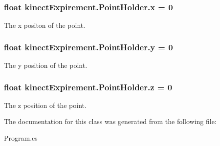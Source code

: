 \subsubsection[{\texorpdfstring{x}{x}}]{\setlength{\rightskip}{0pt plus 5cm}float kinect\+Expirement.\+Point\+Holder.\+x = 0}\hypertarget{classkinect_expirement_1_1_point_holder_a170e58cf7ad5a21dd5c7a50eafbfb0e8}{}\label{classkinect_expirement_1_1_point_holder_a170e58cf7ad5a21dd5c7a50eafbfb0e8}


The x positon of the point. 

\subsubsection[{\texorpdfstring{y}{y}}]{\setlength{\rightskip}{0pt plus 5cm}float kinect\+Expirement.\+Point\+Holder.\+y = 0}\hypertarget{classkinect_expirement_1_1_point_holder_a8e1920f1bd56b015aeae9f19a6f0c5e6}{}\label{classkinect_expirement_1_1_point_holder_a8e1920f1bd56b015aeae9f19a6f0c5e6}


The y position of the point. 

\subsubsection[{\texorpdfstring{z}{z}}]{\setlength{\rightskip}{0pt plus 5cm}float kinect\+Expirement.\+Point\+Holder.\+z = 0}\hypertarget{classkinect_expirement_1_1_point_holder_aa89b5a93efd8f6f6eb033ea7160c5d97}{}\label{classkinect_expirement_1_1_point_holder_aa89b5a93efd8f6f6eb033ea7160c5d97}


The z position of the point. 



The documentation for this class was generated from the following file\+:\begin{DoxyCompactItemize}
\item 
Program.\+cs\end{DoxyCompactItemize}

